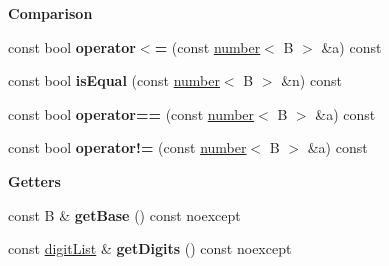 \begin{Indent}{\bf Comparison}
\begin{DoxyCompactItemize}
\item 
\hypertarget{classcjr_1_1number_a7bd4110bfd0fa3b74d1c8f39bc85f2a0}{const bool {\bfseries operator$<$=} (const \hyperlink{classcjr_1_1number}{number}$<$ B $>$ \&a) const }\label{classcjr_1_1number_a7bd4110bfd0fa3b74d1c8f39bc85f2a0}

\item 
\hypertarget{classcjr_1_1number_ae8f6c4c30da9add29b202ba0fdd280ba}{const bool {\bfseries is\-Equal} (const \hyperlink{classcjr_1_1number}{number}$<$ B $>$ \&n) const }\label{classcjr_1_1number_ae8f6c4c30da9add29b202ba0fdd280ba}

\item 
\hypertarget{classcjr_1_1number_a3ee573ccdf8c28f9c6dafa15572c27c9}{const bool {\bfseries operator==} (const \hyperlink{classcjr_1_1number}{number}$<$ B $>$ \&a) const }\label{classcjr_1_1number_a3ee573ccdf8c28f9c6dafa15572c27c9}

\item 
\hypertarget{classcjr_1_1number_aae51bdc811ee8199d5283ab4bbac32b6}{const bool {\bfseries operator!=} (const \hyperlink{classcjr_1_1number}{number}$<$ B $>$ \&a) const }\label{classcjr_1_1number_aae51bdc811ee8199d5283ab4bbac32b6}

\end{DoxyCompactItemize}
\end{Indent}
\begin{Indent}{\bf Getters}\par
\begin{DoxyCompactItemize}
\item 
\hypertarget{classcjr_1_1number_a433504c68497185d691540b631888884}{const B \& {\bfseries get\-Base} () const noexcept}\label{classcjr_1_1number_a433504c68497185d691540b631888884}

\item 
\hypertarget{classcjr_1_1number_a82f2f33ee7549ea6ca2c530dced42b23}{const \hyperlink{classcjr_1_1number_a64ca3e7862f3f4940065b93d38c1a465}{digit\-List} \& {\bfseries get\-Digits} () const noexcept}\label{classcjr_1_1number_a82f2f33ee7549ea6ca2c530dced42b23}

\end{DoxyCompactItemize}
\end{Indent}
